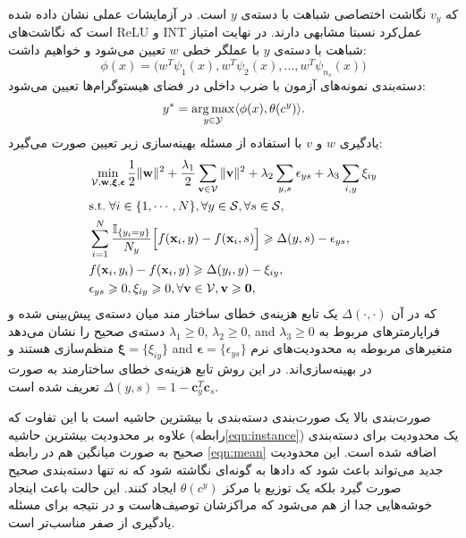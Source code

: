 که $v_y$ نگاشت اختصاصی شباهت با دسته‌ی $y$ است. در آزمایشات عملی نشان داده شده است که نگاشت‌های ReLU و INT عمل‌کرد نسبتا مشابهی دارند. در نهایت امتیاز شباهت با دسته‌ی $y$ با عملگر خطی $w$ تعیین می‌شود و خواهیم داشت:
\begin{equation}
    \phi(x) = \big (w^T\psi_1(x), w^T\psi_2(x), \ldots, w^T\psi_{n_s}(x) \big )
\end{equation}	
دسته‌بندی نمونه‌های آزمون با ضرب داخلی  در فضای هیستوگرام‌ها تعیین می‌شود:
\begin{equation}
y^* = \argmax_{y \in \mathcal{Y}} \langle \phi(x), \theta(c^y) \rangle.
\end{equation}
یادگیری $w$ و $v$ با استفاده از مسئله بهینه‌سازی زیر تعیین صورت می‌گیرد:
\begin{align}\label{eqn:sl}
&\min_{\mathcal{V}, \mathbf{w}, \boldsymbol{\xi}, \boldsymbol{\epsilon}}\frac{1}{2}\|\mathbf{w}\|^2+\frac{\lambda_1}{2}\sum_{\mathbf{v}\in\mathcal{V}}\|\mathbf{v}\|^2+\lambda_2\sum_{y,s}\epsilon_{ys}+\lambda_3\sum_{i,y}\xi_{iy}\\
&\mbox{s.t.} \; \forall i\in\{1,\cdots,N\}, \forall y\in\mathcal{S}, \forall s\in\mathcal{S}, \nonumber\\
&\sum_{i=1}^N {\mathbb{I}_{\{y_i=y\}} \over N_y}\Big[f(\mathbf{x}_i,y)-f(\mathbf{x}_i,s)\Big]\geq\Delta(y,s)-\epsilon_{ys}, \label{eqn:mean}\\
&  f(\mathbf{x}_i,y_i)-f(\mathbf{x}_i,y)\geq\Delta(y_i,y)-\xi_{iy}, \label{eqn:instance}\\
& \epsilon_{ys}\geq0, \xi_{iy}\geq0, \forall \mathbf{v}\in\mathcal{V}, \mathbf{v}\geq\mathbf{0},\nonumber
\end{align}
%
که در آن 
$\Delta(\cdot, \cdot)$
یک تابع هزینه‌ی خطای ساختار مند میان دسته‌ی پیش‌بینی شده و دسته‌ی صحیح را نشان می‌دهد 
  $\lambda_1\geq0$, $\lambda_2\geq0$, and $\lambda_3\geq0$
فراپارمترهای مربوط به منظم‌سازی هستند و 
   $\boldsymbol{\xi}=\{\xi_{iy}\}$ and $\boldsymbol{\epsilon}=\{\epsilon_{ys}\}$ 
متغیرهای مربوطه به محدودیت‌های نرم در بهینه‌سازی‌اند.
     در این روش تابع هزینه‌ی خطای ساختارمند  به صورت 
 $\Delta(y,s)=1-\mathbf{c}_{y}^T\mathbf{c}_{s}$
 تعریف شده است.
 
صورت‌بندی بالا یک صورت‌بندی دسته‌بندی با بیشترین حاشیه است با این تفاوت که علاوه بر محدودیت بیشترین حاشیه (رابطه\eqref{eqn:instance}) یک محدودیت برای دسته‌بندی صحیح به صورت میانگین هم در رابطه 
\eqref{eqn:mean}
اضافه شده است. این محدودیت جدید می‌تواند باعث شود که داد‌ها به گونه‌ای نگاشته شود که نه تنها دسته‌بندی صحیح صورت گیرد بلکه  یک توزیع با مرکز $\theta(c^y)$ ایجاد کنند. این حالت باعث اینجاد خوشه‌هایی جدا از هم می‌شود که مراکزشان توصیف‌هاست و در نتیجه برای مسئله یادگیری از صفر مناسب‌تر است.

